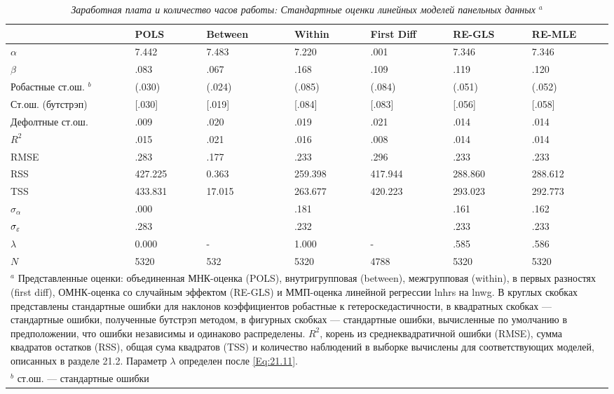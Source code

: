 \begin{table}[ht]
\caption{{\it Заработная плата и количество часов работы: Стандартные оценки линейных моделей панельных данных} ${}^a$} 
\centering
\begin{tabular}{p{2cm} p{1.5cm} p{2cm} p{1.6cm} p{2cm} p{2cm} p{2cm}}
\hline \hline
				& \textbf{POLS} &  \textbf{Between} & \textbf{Within} & \textbf{First Diff} & \textbf{RE-GLS} & \textbf{RE-MLE}\\
\hline
$\alpha$ 	& 7.442	& 7.483  & 7.220& .001&  7.346&7.346\\
 $\beta$& .083&.067 &.168 &.109 & .119& .120\\
 Робастные ст.ош. ${}^b$ & (.030)&(.024) &(.085) &(.084) & (.051)&(.052) \\
 Ст.ош. (бутстрэп) & [.030] & [.019]& [.084]& [.083]& [.056]&[.058] \\
 Дефолтные ст.ош.&{.009} &{.020} & {.019}& {.021}& {.014}& {.014}\\
\hline
$R^2$& .015 &.021 & .016& .008&.014& .014\\
RMSE & .283& .177&.233&.296 & .233&.233 \\
RSS & 427.225& 0.363& 259.398& 417.944& 288.860 & 288.612\\
TSS & 433.831& 17.015& 263.677& 420.223&293.023 & 292.773\\
$\sigma_{\alpha} $&.000 & & .181& &.161 & .162\\
$\sigma_{\varepsilon}$ & .283& & .232& & .233& .233\\
$\lambda$ & 0.000& -&1.000 &- &.585 &.586 \\
$N$ &5320 & 532& 5320& 4788& 5320& 5320\\
\hline \hline
\multicolumn{7}{p{15cm}}{${}^a$ Представленные оценки: объединенная МНК-оценка (POLS), внутригрупповая (between), межгрупповая (within), в первых разностях (first diff), ОМНК-оценка со случайным эффектом (RE-GLS) и ММП-оценка линейной регрессии lnhrs на lnwg. В круглых скобках представлены стандартные ошибки для наклонов коэффициентов робастные к гетероскедастичности, в квадратных скобках --- стандартные ошибки, полученные бутстрэп методом, в фигурных скобках --- стандартные ошибки, вычисленные по умолчанию в предположении, что ошибки независимы и одинаково распределены. $R^2$, корень из среднеквадратичной ошибки (RMSE), сумма квадратов остатков (RSS), общая сума квадратов (TSS) и количество наблюдений в выборке вычислены для соответствующих моделей, описанных в разделе 21.2. Параметр $\lambda$ определен после \ref{Eq:21.11}.} \\
\multicolumn{7}{l}{${}^b$ ст.ош. --- стандартные ошибки}
\end{tabular}
\label{Tab:21.2}
\end{table}

